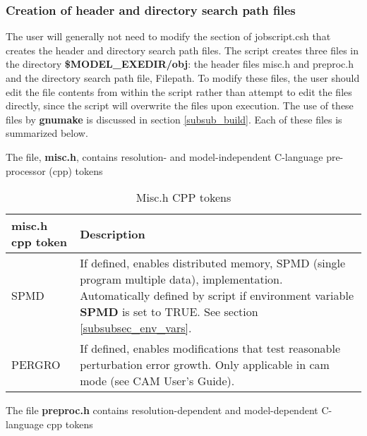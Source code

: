 \subsubsection {Creation of header and directory search path files}
\label{subsubsec_cpp}

The user will generally not need to modify the section of
jobscript.csh that creates the header and directory search path files.
The script creates three files in the directory {\bf
\$MODEL\_EXEDIR/obj}: the header files misc.h and preproc.h and the
directory search path file, Filepath. To modify these files, the user
should edit the file contents from within the script rather than
attempt to edit the files directly, since the script will overwrite
the files upon execution. The use of these files by {\bf gnumake}
is discussed in section \ref{subsub_build}. Each of these files is
summarized below.

The file, {\bf misc.h}, contains resolution- and model-independent
C-language pre-processor (cpp) tokens

\medskip
\begin{longtable}{|p{1.5in}|p{4.5in}|}
\caption{\label{misc.h} Misc.h CPP tokens} \\
\hline
\endhead
\hline
{\bf misc.h cpp token} & {\bf Description}  \\ \hline
SPMD    & If defined, enables distributed memory, SPMD (single program
          multiple data), implementation. Automatically defined by script if
          environment variable {\bf SPMD} is set to TRUE. 
          See section  \ref{subsubsec_env_vars}.  \\ \hline
PERGRO & If defined, enables modifications that test reasonable perturbation error growth. 
          Only applicable in cam mode (see CAM User's Guide). \\ \hline
\end{longtable}
\medskip

The file {\bf preproc.h} contains resolution-dependent and model-dependent
C-language cpp tokens

